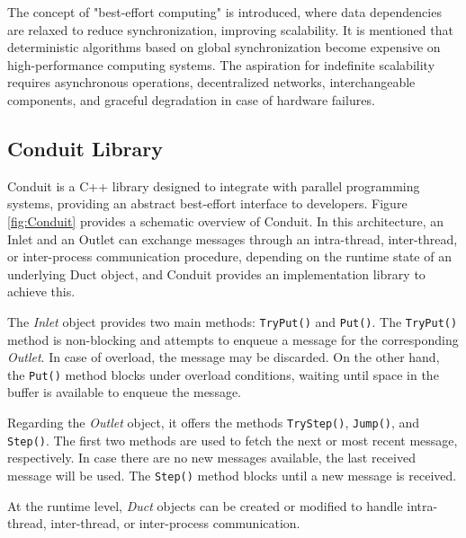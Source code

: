 \documentclass[11pt]{article}
\begin{document}
\begin{multicols*}{2}[\columnsep=1cm]
    The concept of "best-effort computing" is introduced, where data dependencies are relaxed to reduce synchronization, improving scalability. It is mentioned that deterministic algorithms based on global synchronization become expensive on high-performance computing systems. The aspiration for indefinite scalability requires asynchronous operations, decentralized networks, interchangeable components, and graceful degradation in case of hardware failures.
    
    \subsection{Conduit Library}
    Conduit is a C++ library designed to integrate with parallel programming systems, providing an abstract best-effort interface to developers. Figure \ref{fig:Conduit} provides a schematic overview of Conduit. In this architecture, an Inlet and an Outlet can exchange messages through an intra-thread, inter-thread, or inter-process communication procedure, depending on the runtime state of an underlying Duct object, and Conduit provides an implementation library to achieve this.
    
    The \textit{Inlet} object provides two main methods: \texttt{TryPut()} and \texttt{Put()}. The \texttt{TryPut()} method is non-blocking and attempts to enqueue a message for the corresponding \textit{Outlet}. In case of overload, the message may be discarded. On the other hand, the \texttt{Put()} method blocks under overload conditions, waiting until space in the buffer is available to enqueue the message.
    
    Regarding the \textit{Outlet} object, it offers the methods \texttt{TryStep()}, \texttt{Jump()}, and \texttt{Step()}. The first two methods are used to fetch the next or most recent message, respectively. In case there are no new messages available, the last received message will be used. The \texttt{Step()} method blocks until a new message is received.
    
    At the runtime level, \textit{Duct} objects can be created or modified to handle intra-thread, inter-thread, or inter-process communication.
    

\end{multicols*}
\end{document}
